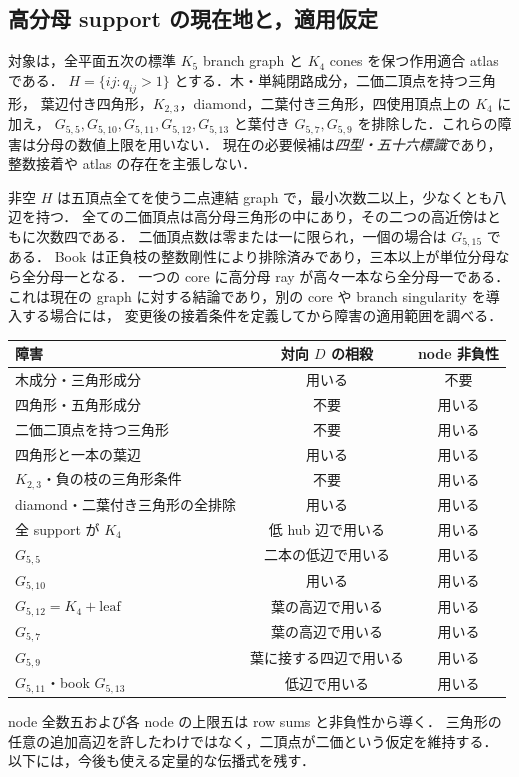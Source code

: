 \subsection{高分母 support の現在地と，適用仮定}
\label{ns19:current-support}

対象は，全平面五次の標準 $K_5$ branch graph と $K_4$ cones を保つ作用適合 atlas である．
$H=\{ij:q_{ij}>1\}$ とする．木・単純閉路成分，二価二頂点を持つ三角形，
葉辺付き四角形，$K_{2,3}$，diamond，二葉付き三角形，四使用頂点上の $K_4$ に加え，
$G_{5,5},G_{5,10},G_{5,11},G_{5,12},G_{5,13}$ と葉付き $G_{5,7},G_{5,9}$ を排除した．これらの障害は分母の数値上限を用いない．
現在の必要候補は\emph{四型・五十六標識}であり，整数接着や atlas の存在を主張しない．

非空 $H$ は五頂点全てを使う二点連結 graph で，最小次数二以上，少なくとも八辺を持つ．
全ての二価頂点は高分母三角形の中にあり，その二つの高近傍はともに次数四である．
二価頂点数は零または一に限られ，一個の場合は $G_{5,15}$ である．
Book は正負枝の整数剛性により排除済みであり，三本以上が単位分母なら全分母一となる．
一つの core に高分母 ray が高々一本なら全分母一である．
これは現在の graph に対する結論であり，別の core や branch singularity を導入する場合には，
変更後の接着条件を定義してから障害の適用範囲を調べる．

\begin{center}
\begin{tabular}{lcc}
障害 & 対向 $D$ の相殺 & node 非負性\\\hline
木成分・三角形成分 & 用いる & 不要\\
四角形・五角形成分 & 不要 & 用いる\\
二価二頂点を持つ三角形 & 不要 & 用いる\\
四角形と一本の葉辺 & 用いる & 用いる\\
$K_{2,3}$・負の枝の三角形条件 & 不要 & 用いる\\
diamond・二葉付き三角形の全排除 & 用いる & 用いる\\
全 support が $K_4$ & 低 hub 辺で用いる & 用いる\\
$G_{5,5}$ & 二本の低辺で用いる & 用いる\\
$G_{5,10}$ & 用いる & 用いる\\
$G_{5,12}=K_4+\mathrm{leaf}$ & 葉の高辺で用いる & 用いる\\
$G_{5,7}$ & 葉の高辺で用いる & 用いる\\
$G_{5,9}$ & 葉に接する四辺で用いる & 用いる\\
$G_{5,11}$・book $G_{5,13}$ & 低辺で用いる & 用いる
\end{tabular}
\end{center}
node 全数五および各 node の上限五は row sums と非負性から導く．
三角形の任意の追加高辺を許したわけではなく，二頂点が二価という仮定を維持する．
以下には，今後も使える定量的な伝播式を残す．

